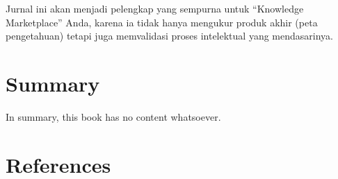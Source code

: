 \documentclass[
  letterpaper,
  DIV=11,
  numbers=noendperiod]{scrreprt}
\newlength{\cslhangindent}
\newenvironment{CSLReferences}[2] %
 {\begin{list}{}{%
  \setlength{\itemindent}{0pt}
  \setlength{\leftmargin}{0pt}
  \setlength{\parsep}{0pt}
  \ifodd #1
   \setlength{\leftmargin}{\cslhangindent}
   \setlength{\itemindent}{-1\cslhangindent}
  \fi
  \setlength{\itemsep}{#2\baselineskip}}}
 {\end{list}}
\begin{document}
Jurnal ini akan menjadi pelengkap yang sempurna untuk ``Knowledge
Marketplace'' Anda, karena ia tidak hanya mengukur produk akhir (peta
pengetahuan) tetapi juga memvalidasi proses intelektual yang
mendasarinya.


\chapter{Summary}\label{summary}

In summary, this book has no content whatsoever.


\chapter*{References}\label{references}


\label{refs}
\begin{CSLReferences}{0}{1}
\end{CSLReferences}
\end{document}
